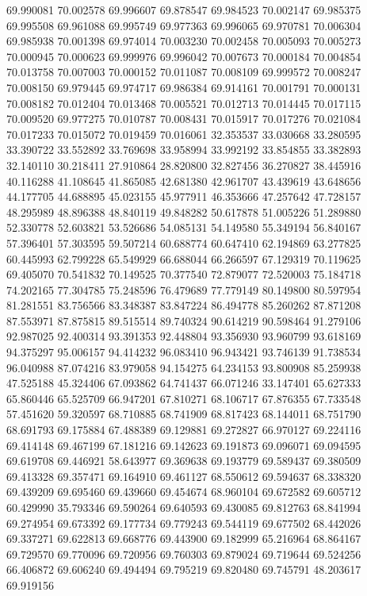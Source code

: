 69.990081
70.002578
69.996607
69.878547
69.984523
70.002147
69.985375
69.995508
69.961088
69.995749
69.977363
69.996065
69.970781
70.006304
69.985938
70.001398
69.974014
70.003230
70.002458
70.005093
70.005273
70.000945
70.000623
69.999976
69.996042
70.007673
70.000184
70.004854
70.013758
70.007003
70.000152
70.011087
70.008109
69.999572
70.008247
70.008150
69.979445
69.974717
69.986384
69.914161
70.001791
70.000131
70.008182
70.012404
70.013468
70.005521
70.012713
70.014445
70.017115
70.009520
69.977275
70.010787
70.008431
70.015917
70.017276
70.021084
70.017233
70.015072
70.019459
70.016061
32.353537
33.030668
33.280595
33.390722
33.552892
33.769698
33.958994
33.992192
33.854855
33.382893
32.140110
30.218411
27.910864
28.820800
32.827456
36.270827
38.445916
40.116288
41.108645
41.865085
42.681380
42.961707
43.439619
43.648656
44.177705
44.688895
45.023155
45.977911
46.353666
47.257642
47.728157
48.295989
48.896388
48.840119
49.848282
50.617878
51.005226
51.289880
52.330778
52.603821
53.526686
54.085131
54.149580
55.349194
56.840167
57.396401
57.303595
59.507214
60.688774
60.647410
62.194869
63.277825
60.445993
62.799228
65.549929
66.688044
66.266597
67.129319
70.119625
69.405070
70.541832
70.149525
70.377540
72.879077
72.520003
75.184718
74.202165
77.304785
75.248596
76.479689
77.779149
80.149800
80.597954
81.281551
83.756566
83.348387
83.847224
86.494778
85.260262
87.871208
87.553971
87.875815
89.515514
89.740324
90.614219
90.598464
91.279106
92.987025
92.400314
93.391353
92.448804
93.356930
93.960799
93.618169
94.375297
95.006157
94.414232
96.083410
96.943421
93.746139
91.738534
96.040988
87.074216
83.979058
94.154275
64.234153
93.800908
85.259938
47.525188
45.324406
67.093862
64.741437
66.071246
33.147401
65.627333
65.860446
65.525709
66.947201
67.810271
68.106717
67.876355
67.733548
57.451620
59.320597
68.710885
68.741909
68.817423
68.144011
68.751790
68.691793
69.175884
67.488389
69.129881
69.272827
66.970127
69.224116
69.414148
69.467199
67.181216
69.142623
69.191873
69.096071
69.094595
69.619708
69.446921
58.643977
69.369638
69.193779
69.589437
69.380509
69.413328
69.357471
69.164910
69.461127
68.550612
69.594637
68.338320
69.439209
69.695460
69.439660
69.454674
68.960104
69.672582
69.605712
60.429990
35.793346
69.590264
69.640593
69.430085
69.812763
68.841994
69.274954
69.673392
69.177734
69.779243
69.544119
69.677502
68.442026
69.337271
69.622813
69.668776
69.443900
69.182999
65.216964
68.864167
69.729570
69.770096
69.720956
69.760303
69.879024
69.719644
69.524256
66.406872
69.606240
69.494494
69.795219
69.820480
69.745791
48.203617
69.919156

